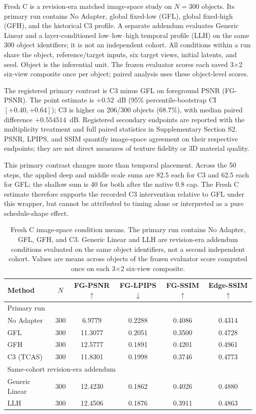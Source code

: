 \documentclass[times,twocolumn,final]{elsarticle}
\begin{document}
Fresh C is a revision-era matched image-space study on $N=300$ objects. Its primary run contains No Adapter, global fixed-low (GFL), global fixed-high (GFH), and the historical C3 profile. A separate addendum evaluates Generic Linear and a layer-conditioned low--low--high temporal profile (LLH) on the same 300 object identifiers; it is not an independent cohort. All conditions within a run share the object, reference/target inputs, six target views, initial latents, and seed. Object is the inferential unit. The frozen evaluator scores each saved 3$\times$2 six-view composite once per object; paired analysis uses these object-level scores.

The registered primary contrast is C3 minus GFL on foreground PSNR (FG-PSNR). The point estimate is $+0.52$~dB (95\% percentile-bootstrap CI $[+0.40,+0.64]$); C3 is higher on 206/300 objects (68.7\%), with median paired difference $+0.554514$~dB. Registered secondary endpoints are reported with the multiplicity treatment and full paired statistics in Supplementary Section S2. PSNR, LPIPS, and SSIM quantify image-space agreement on their respective endpoints; they are not direct measures of texture fidelity or 3D material quality.

This primary contrast changes more than temporal placement. Across the 50 steps, the applied deep and middle scale sums are 82.5 each for C3 and 62.5 each for GFL; the shallow sum is 40 for both after the native 0.8 cap. The Fresh C estimate therefore supports the recorded C3 intervention relative to GFL under this wrapper, but cannot be attributed to timing alone or interpreted as a pure schedule-shape effect.

\begin{table}[t]
\centering
\caption{Fresh C image-space condition means. The primary run contains No Adapter, GFL, GFH, and C3. Generic Linear and LLH are revision-era addendum conditions evaluated on the same object identifiers, not a second independent cohort. Values are means across objects of the frozen evaluator score computed once on each 3$\times$2 six-view composite.}
\label{tab:freshc-absolute}
\scriptsize\setlength{\tabcolsep}{4pt}
\begin{tabular}{lccccc}
\toprule
Method & $N$ & FG-PSNR$\uparrow$ & FG-LPIPS$\downarrow$ & FG-SSIM$\uparrow$ & Edge-SSIM$\uparrow$ \\
\midrule
\multicolumn{6}{l}{Primary run} \\
No Adapter & 300 & 6.9779 & 0.2288 & 0.4086 & 0.4314 \\
GFL & 300 & 11.3077 & 0.2051 & 0.3500 & 0.4728 \\
GFH & 300 & 12.5777 & 0.1891 & 0.4201 & 0.4961 \\
C3 (TCAS) & 300 & 11.8301 & 0.1998 & 0.3746 & 0.4773 \\
\midrule
\multicolumn{6}{l}{Same-cohort revision-era addendum} \\
Generic Linear & 300 & 12.4230 & 0.1862 & 0.4026 & 0.4880 \\
LLH & 300 & 12.4506 & 0.1876 & 0.3911 & 0.4863 \\
\bottomrule
\end{tabular}
\end{table}
\end{document}

